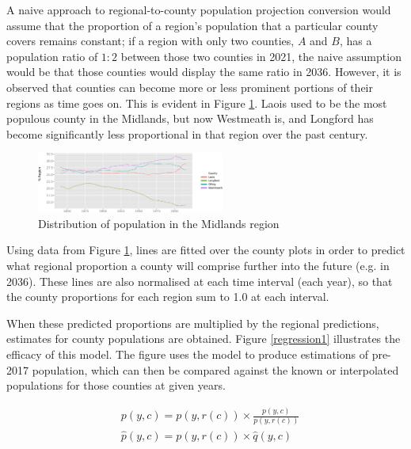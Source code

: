 \documentclass[twocolumn]{article}
\begin{document}
A naive approach to regional-to-county population projection conversion would
assume that the proportion of a region's population that a particular county
covers remains constant; if a region with only two counties, $A$ and $B$, has a
population ratio of $1:2$ between those two counties in 2021, the naive
assumption would be that those counties would display the same ratio in 2036.
However, it is observed that counties can become more or less prominent
portions of their regions as time goes on.  This is evident in Figure
\ref{midlands}.  Laois used to be the most populous county in the Midlands, but
now Westmeath is, and Longford has become significantly less proportional in
that region over the past century.

\begin{figure}
    \centering
    \includegraphics[width=0.55\textwidth]{media/pdf/midlands-population-proportion.svg.pdf}
    \caption{Distribution of population in the Midlands region\label{midlands}}
\end{figure}

Using data from Figure \ref{midlands}, lines are fitted over the county plots in
order to predict what regional proportion a county will comprise further
into the future (e.g. in 2036).  These lines are also normalised at each time
interval (each year), so that the county proportions for each region sum to 1.0
at each interval.

When these predicted proportions are multiplied by the
regional predictions, estimates for county populations are obtained.  Figure
\ref{regression1} illustrates the efficacy of this model.  The figure uses the
model to
produce estimations of pre-2017 population, which can then be compared against
the known or interpolated populations for those counties at given years.

\begin{align}
    & p(y, c) = p(y, r(c)) \times \frac{p(y, c)}{p(y, r(c))}
    \label{eq:pop_model_deriv} \\
    & \hat{p}(y, c) = p(y, r(c)) \times \hat{q}(y, c)
    \label{eq:pop_model}
\end{align}
\end{document}
